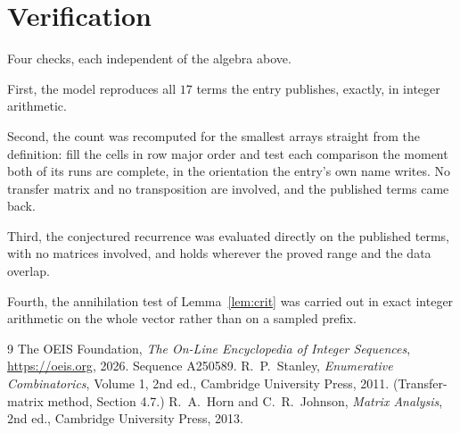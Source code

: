\documentclass[11pt,a4paper]{article}
\theoremstyle{plain}
\theoremstyle{definition}
\begin{document}
\section{Verification}

Four checks, each independent of the algebra above.

First, the model reproduces all $17$ terms the entry publishes, exactly, in integer
arithmetic.

Second, the count was recomputed for the smallest arrays straight from the definition: fill the
cells in row major order and test each comparison the moment both of its runs are complete,
in the orientation the entry's own name writes. No transfer matrix and no transposition are
involved, and the published terms came back.

Third, the conjectured recurrence was evaluated directly on the published terms, with no
matrices involved, and holds wherever the proved range and the data overlap.

Fourth, the annihilation test of Lemma~\ref{lem:crit} was carried out in exact integer
arithmetic on the whole vector rather than on a sampled prefix.

\begin{thebibliography}{9}
 The OEIS Foundation, \emph{The On-Line Encyclopedia of Integer
Sequences}, \url{https://oeis.org}, 2026. Sequence A250589.
 R.~P.~Stanley, \emph{Enumerative Combinatorics}, Volume 1, 2nd ed.,
Cambridge University Press, 2011. (Transfer-matrix method, Section 4.7.)
 R.~A.~Horn and C.~R.~Johnson, \emph{Matrix Analysis}, 2nd ed., Cambridge
University Press, 2013.
\end{thebibliography}
\end{document}
